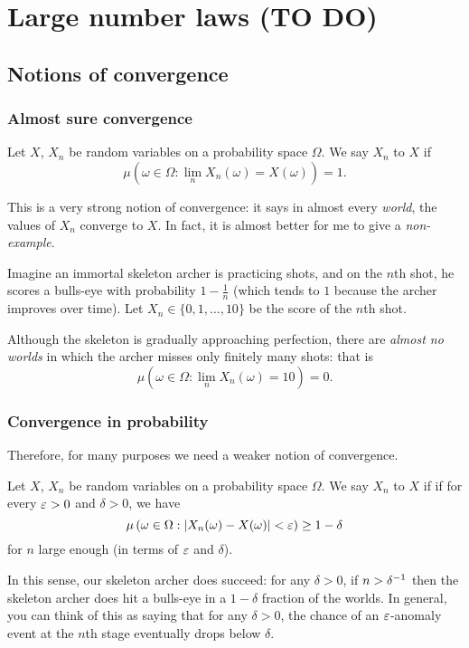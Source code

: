 \chapter{Large number laws (TO DO)}
\section{Notions of convergence}
\subsection{Almost sure convergence}
\begin{definition}
	Let $X$, $X_n$ be random variables on a probability space $\Omega$.
	We say $X_n$  to $X$ if
	\[ \mu \left( \omega \in \Omega :
		\lim_n X_n(\omega) = X(\omega) \right) = 1. \]
\end{definition}
This is a very strong notion of convergence:
it says in almost every \emph{world},
the values of $X_n$ converge to $X$.
In fact, it is almost better for me to give a \emph{non-example}.
\begin{example}
	Imagine an immortal skeleton archer is practicing shots,
	and on the $n$th shot, he scores a bulls-eye with probability
	$1 - \frac 1n$
	(which tends to $1$ because the archer improves over time).
	Let $X_n \in \{0, 1, \dots, 10\}$ be the score of the $n$th shot.

	Although the skeleton is gradually approaching perfection,
	there are \emph{almost no worlds} in which the archer
	misses only finitely many shots: that is
	\[ \mu \left( \omega \in \Omega :
		\lim_n X_n(\omega) = 10 \right) = 0. \]
\end{example}

\subsection{Convergence in probability}
Therefore, for many purposes we need a weaker notion of convergence.
\begin{definition}
	Let $X$, $X_n$ be random variables on a probability space $\Omega$.
	We say $X_n$  to $X$ if
	if for every $\varepsilon > 0$ and $\delta > 0$, we have
	\[ \mu \left( \omega \in \Omega :
			\left\lvert X_n(\omega) - X(\omega) \right\rvert < \varepsilon
		\right) \ge 1 - \delta  \]
	for $n$ large enough (in terms of $\varepsilon$ and $\delta$).
\end{definition}
In this sense, our skeleton archer does succeed:
for any $\delta > 0$, if $n > \delta^{-1}$
then the skeleton archer does hit a bulls-eye
in a $1-\delta$ fraction of the worlds.
In general, you can think of this as saying that for any $\delta > 0$,
the chance of an $\varepsilon$-anomaly event at the $n$th stage
eventually drops below $\delta$.

